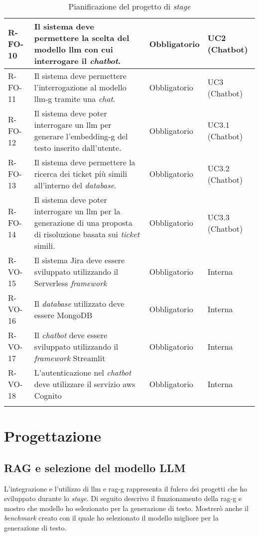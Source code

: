 \begin{longtable}{|p{1.5cm}|p{5.5cm}|p{2cm}|p{2.5cm}|}
    \hline
    R-FO-10 & Il sistema deve permettere la scelta del modello \gls{llm} con cui interrogare il \textit{chatbot}. & Obbligatorio & UC2 (Chatbot) \\
    \hline
    R-FO-11 & Il sistema deve permettere l'interrogazione al modello \gls{llm-g} tramite una \textit{chat}. & Obbligatorio & UC3 (Chatbot) \\
    \hline
    R-FO-12 & Il sistema deve poter interrogare un \gls{llm} per generare l'\gls{embedding-g} del testo inserito dall'utente. & Obbligatorio & UC3.1 (Chatbot) \\
    \hline
    R-FO-13 & Il sistema deve permettere la ricerca dei ticket più simili all'interno del \textit{database}. & Obbligatorio & UC3.2 (Chatbot) \\
    \hline
    R-FO-14 & Il sistema deve poter interrogare un \gls{llm} per la generazione di una proposta di risoluzione basata sui \textit{ticket} simili. & Obbligatorio & UC3.3 (Chatbot) \\
    \hline
    R-VO-15 & Il sistema Jira deve essere sviluppato utilizzando il Serverless \textit{framework}  & Obbligatorio & Interna \\
    \hline
    R-VO-16 & Il \textit{database} utilizzato deve essere MongoDB & Obbligatorio & Interna \\
    \hline
    R-VO-17 & Il \textit{chatbot} deve essere sviluppato utilizzando il \textit{framework} Streamlit & Obbligatorio & Interna \\
    \hline
    R-VO-18 & L'autenticazione nel \textit{chatbot} deve utilizzare il servizio \gls{aws} Cognito & Obbligatorio & Interna \\

    
    \hline
    \caption{Pianificazione del progetto di \textit{stage}}
    \label{tab:tracciamentoRequisiti}
\end{longtable}

\section{Progettazione}
\subsection{RAG e selezione del modello LLM} \label{sec:rag}
L'integrazione e l'utilizzo di \gls{llm} e \gls{rag-g} rappresenta il fulcro dei progetti che ho sviluppato durante lo \textit{stage}.
Di seguito descrivo il funzionamento della \gls{rag-g} e mostro che modello ho selezionato per la generazione di testo. Mostrerò anche il \textit{benchmark} creato con il quale ho selezionato il modello migliore per la generazione di testo.
